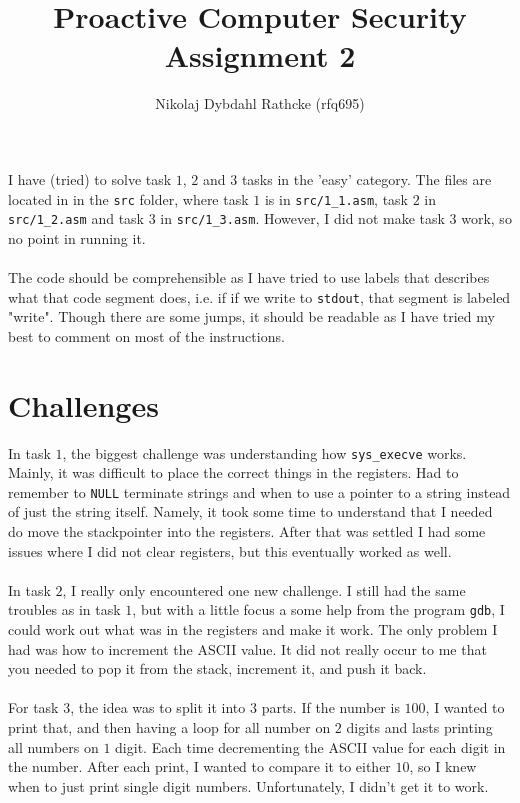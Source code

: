 \documentclass[a4paper]{article}
\author{Nikolaj Dybdahl Rathcke (rfq695)}
\title{Proactive Computer Security \\ Assignment 2}
\begin{document}
\maketitle

I have (tried) to solve task $1$, $2$ and $3$ tasks in the 'easy' category. The files are located in in the \texttt{src} folder, where task $1$ is in \texttt{src/1\_1.asm}, task $2$ in \texttt{src/1\_2.asm} and task $3$ in \texttt{src/1\_3.asm}. However, I did not make task $3$ work, so no point in running it. \\
\\
The code should be comprehensible as I have tried to use labels that describes what that code segment does, i.e. if if we write to \texttt{stdout}, that segment is labeled "write". Though there are some jumps, it should be readable as I have tried my best to comment on most of the instructions.

\section{Challenges}
In task $1$, the biggest challenge was understanding how \texttt{sys\_execve} works. Mainly, it was difficult to place the correct things in the registers. Had to remember to \texttt{NULL} terminate strings and when to use a pointer to a string instead of just the string itself. Namely, it took some time to understand that I needed do move the stackpointer into the registers. After that was settled I had some issues where I did not clear registers, but this eventually worked as well. \\
\\
In task $2$, I really only encountered one new challenge. I still had the same troubles as in task $1$, but with a little focus a some help from the program \texttt{gdb}, I could work out what was in the registers and make it work. The only problem I had was how to increment the ASCII value. It did not really occur to me that you needed to pop it from the stack, increment it, and push it back. \\
\\
For task $3$, the idea was to split it into $3$ parts. If the number is $100$, I wanted to print that, and then having a loop for all number on $2$ digits and lasts printing all numbers on $1$ digit. Each time decrementing the ASCII value for each digit in the number. After each print, I wanted to compare it to either $10$, so I knew when to just print single digit numbers. Unfortunately, I didn't get it to work.
\end{document}
